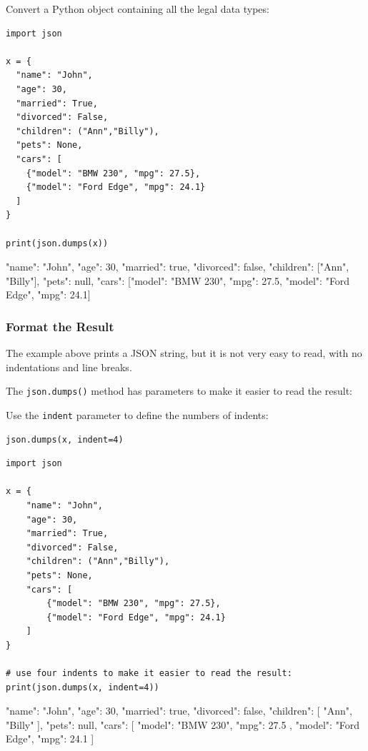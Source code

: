 \documentclass[12pt,a4paper]{article}
\newcommand{\code}[1]{%
	\colorbox{backcolour}{\lstinline{#1}}%
}
\newcommand{\lcode}[1]{%
	\lstinline{#1}%
}
\begin{document}
\begin{ebox}
Convert a Python object containing all the legal data types:
	\begin{lstlisting}
import json

x = {
  "name": "John",
  "age": 30,
  "married": True,
  "divorced": False,
  "children": ("Ann","Billy"),
  "pets": None,
  "cars": [
    {"model": "BMW 230", "mpg": 27.5},
    {"model": "Ford Edge", "mpg": 24.1}
  ]
}

print(json.dumps(x))
	\end{lstlisting}
\tcblower
	\begin{vercode}
{"name": "John", "age": 30, "married": true, "divorced": false,
"children": ["Ann", "Billy"], "pets": null,
"cars": [{"model": "BMW 230", "mpg": 27.5},
{"model": "Ford Edge", "mpg": 24.1}]}
	\end{vercode}
\end{ebox}
\subsubsection{Format the Result}

The example above prints a JSON string, but it is not very easy to read, with
no indentations and line breaks.

The \code{json.dumps()} method has parameters to make it easier to read the result:

\begin{ebox}
Use the \lcode{indent} parameter to define the numbers of indents:
	\begin{lstlisting}
json.dumps(x, indent=4)
	\end{lstlisting}
\end{ebox}

\begin{ebox}
	\begin{lstlisting}
import json

x = {
    "name": "John",
    "age": 30,
    "married": True,
    "divorced": False,
    "children": ("Ann","Billy"),
    "pets": None,
    "cars": [
        {"model": "BMW 230", "mpg": 27.5},
        {"model": "Ford Edge", "mpg": 24.1}
    ]
}

# use four indents to make it easier to read the result:
print(json.dumps(x, indent=4))
	\end{lstlisting}
\tcblower
	\begin{vercode}
{
    "name": "John",
    "age": 30,
    "married": true,
    "divorced": false,
    "children": [
        "Ann",
        "Billy"
    ],
    "pets": null,
    "cars": [
        {
            "model": "BMW 230",
            "mpg": 27.5
        },
        {
            "model": "Ford Edge",
            "mpg": 24.1
        }
    ]
}
	\end{vercode}
\end{ebox}
\end{document}
